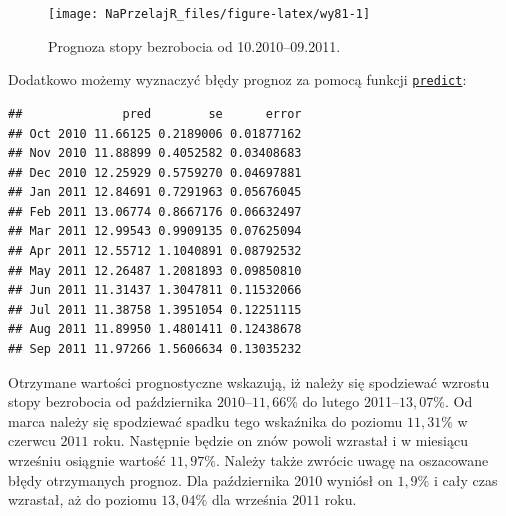 \documentclass[polish,]{book}
\newenvironment{Shaded}{\begin{snugshade}}{\end{snugshade}}
\newcommand{\DataTypeTok}[1]{\textcolor[rgb]{0.13,0.29,0.53}{#1}}
\newcommand{\DecValTok}[1]{\textcolor[rgb]{0.00,0.00,0.81}{#1}}
\newcommand{\KeywordTok}[1]{\textcolor[rgb]{0.13,0.29,0.53}{\textbf{#1}}}
\newcommand{\NormalTok}[1]{#1}
\newcommand{\OperatorTok}[1]{\textcolor[rgb]{0.81,0.36,0.00}{\textbf{#1}}}
\newcommand{\StringTok}[1]{\textcolor[rgb]{0.31,0.60,0.02}{#1}}
\begin{document}
\begin{figure}[h]

{\centering \texttt{[image: NaPrzelajR\_files/figure-latex/wy81-1]} 

}

\caption{Prognoza stopy bezrobocia od 10.2010–09.2011.}\label{fig:wy81}
\end{figure}

Dodatkowo możemy wyznaczyć błędy prognoz za pomocą funkcji \href{https://rdrr.io/r/stats/predict.lm.html}{\texttt{predict}}:

\begin{Shaded}
\end{Shaded}

\begin{verbatim}
##              pred        se      error
## Oct 2010 11.66125 0.2189006 0.01877162
## Nov 2010 11.88899 0.4052582 0.03408683
## Dec 2010 12.25929 0.5759270 0.04697881
## Jan 2011 12.84691 0.7291963 0.05676045
## Feb 2011 13.06774 0.8667176 0.06632497
## Mar 2011 12.99543 0.9909135 0.07625094
## Apr 2011 12.55712 1.1040891 0.08792532
## May 2011 12.26487 1.2081893 0.09850810
## Jun 2011 11.31437 1.3047811 0.11532066
## Jul 2011 11.38758 1.3951054 0.12251115
## Aug 2011 11.89950 1.4801411 0.12438678
## Sep 2011 11.97266 1.5606634 0.13035232
\end{verbatim}

Otrzymane wartości prognostyczne wskazują, iż należy się spodziewać wzrostu stopy
bezrobocia od października \(2010\)--\(11,66\%\) do lutego 2011--\(13,07\%\). Od marca
należy się spodziewać spadku tego wskaźnika do poziomu \(11,31\%\) w czerwcu \(2011\)
roku. Następnie będzie on znów powoli wzrastał i w miesiącu wrześniu osiągnie
wartość \(11,97\%\). Należy także zwrócic uwagę na oszacowane błędy otrzymanych
prognoz. Dla października 2010 wyniósł on \(1,9\%\) i cały czas wzrastał, aż do poziomu \(13,04\%\) dla września \(2011\) roku.
\end{document}
